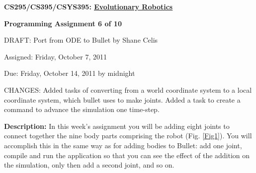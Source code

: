 \documentclass[12pt]{article}
\begin{document}
\centerline{\bf \Large CS295/CS395/CSYS395: \href{CS295\_395\_Syllabus.pdf}{\underline{Evolutionary Robotics}}}

\vspace{0.5cm}

\centerline{\bf \large Programming Assignment 6 of 10}
\vspace{0.25cm} \centerline{\color{red}DRAFT: Port from ODE to Bullet by Shane Celis \color{black}}

\vspace{0.5cm}

\centerline{\large Assigned: Friday, October 7, 2011}

\vspace{0.5cm}

\centerline{\large Due: Friday, October 14, 2011 by midnight}

\vspace{0.5cm}

\noindent \color{red}CHANGES: Added tasks of converting from a world coordinate system to a local coordinate system, which bullet uses to make joints.  Added a task to create a command to advance the simulation one time-step.\color{black}

\noindent \textbf{Description:} In this week's assignment you will be adding eight joints to connect together the nine body parts comprising the robot (Fig. \ref{Fig1}). You will accomplish this in the same way as for adding bodies to Bullet: add one joint, compile and run the application so that you can see the effect of the addition on the simulation, only then add a second joint, and so on.
\end{document}

